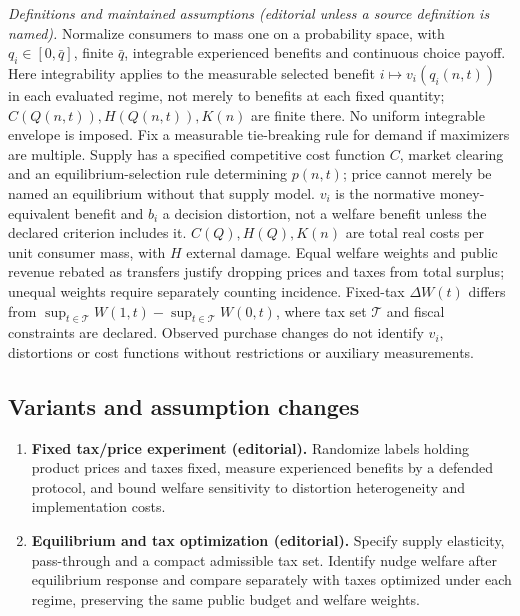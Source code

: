 \documentclass[11pt,a4paper]{article}
\begin{document}
\emph{Definitions and maintained assumptions (editorial unless a source definition is named).} Normalize consumers to mass one on a probability space, with \(q_i\in[0,\bar q]\), finite \(\bar q\), integrable experienced benefits and continuous choice payoff. Here integrability applies to the measurable selected benefit \(i\mapsto v_i(q_i(n,t))\) in each evaluated regime, not merely to benefits at each fixed quantity; \(C(Q(n,t)),H(Q(n,t)),K(n)\) are finite there. No uniform integrable envelope is imposed. Fix a measurable tie-breaking rule for demand if maximizers are multiple. Supply has a specified competitive cost function \(C\), market clearing and an equilibrium-selection rule determining \(p(n,t)\); price cannot merely be named an equilibrium without that supply model. \(v_i\) is the normative money-equivalent benefit and \(b_i\) a decision distortion, not a welfare benefit unless the declared criterion includes it. \(C(Q),H(Q),K(n)\) are total real costs per unit consumer mass, with \(H\) external damage. Equal welfare weights and public revenue rebated as transfers justify dropping prices and taxes from total surplus; unequal weights require separately counting incidence. Fixed-tax \(\Delta W(t)\) differs from \(\sup_{t\in\mathcal T}W(1,t)-\sup_{t\in\mathcal T}W(0,t)\), where tax set \(\mathcal T\) and fiscal constraints are declared. Observed purchase changes do not identify \(v_i\), distortions or cost functions without restrictions or auxiliary measurements.
\subsection*{Variants and assumption changes}
\begin{enumerate}
\item \textbf{Fixed tax/price experiment (editorial).} Randomize labels holding product prices and taxes fixed, measure experienced benefits by a defended protocol, and bound welfare sensitivity to distortion heterogeneity and implementation costs.
\item \textbf{Equilibrium and tax optimization (editorial).} Specify supply elasticity, pass-through and a compact admissible tax set. Identify nudge welfare after equilibrium response and compare separately with taxes optimized under each regime, preserving the same public budget and welfare weights.
\end{enumerate}
\end{document}
